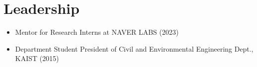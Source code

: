 \section{Leadership}

\begin{itemize}[label=$\cdot$]

    \item Mentor for Research Interns at NAVER LABS (2023) 
    
    \vspace{-1mm}
    \item Department Student President of Civil and Environmental Engineering Dept., KAIST (2015) 
    
\end{itemize}

